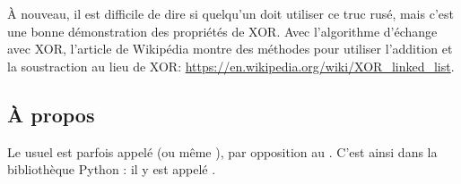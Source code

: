 À nouveau, il est difficile de dire si quelqu'un doit utiliser ce truc rusé, mais
c'est une bonne démonstration des propriétés de XOR. Avec l'algorithme d'échange
avec XOR, l'article de Wikipédia montre des méthodes pour utiliser l'addition et
la soustraction au lieu de XOR:
\url{https://en.wikipedia.org/wiki/XOR_linked_list}.



\subsection{À propos}

Le  usuel est parfois appelé  (ou même ), par opposition
au .
C'est ainsi dans la bibliothèque Python : il y est appelé .

